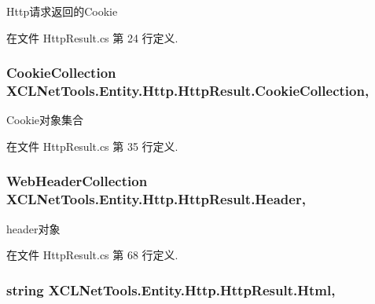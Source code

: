 Http请求返回的\-Cookie 



在文件 Http\-Result.\-cs 第 24 行定义.

\hypertarget{class_x_c_l_net_tools_1_1_entity_1_1_http_1_1_http_result_a30f5eb22081db0c17f2924ac0ee89156}{
\subsubsection[{Cookie\-Collection}]{\setlength{\rightskip}{0pt plus 5cm}Cookie\-Collection X\-C\-L\-Net\-Tools.\-Entity.\-Http.\-Http\-Result.\-Cookie\-Collection\hspace{0.3cm}{\ttfamily [get]}, {\ttfamily [set]}}}\label{class_x_c_l_net_tools_1_1_entity_1_1_http_1_1_http_result_a30f5eb22081db0c17f2924ac0ee89156}


Cookie对象集合 



在文件 Http\-Result.\-cs 第 35 行定义.

\hypertarget{class_x_c_l_net_tools_1_1_entity_1_1_http_1_1_http_result_af2f67a87b13cf52358900ff814f88f20}{
\subsubsection[{Header}]{\setlength{\rightskip}{0pt plus 5cm}Web\-Header\-Collection X\-C\-L\-Net\-Tools.\-Entity.\-Http.\-Http\-Result.\-Header\hspace{0.3cm}{\ttfamily [get]}, {\ttfamily [set]}}}\label{class_x_c_l_net_tools_1_1_entity_1_1_http_1_1_http_result_af2f67a87b13cf52358900ff814f88f20}


header对象 



在文件 Http\-Result.\-cs 第 68 行定义.

\hypertarget{class_x_c_l_net_tools_1_1_entity_1_1_http_1_1_http_result_a9fc43bbbeb2f24faeeab16785cd7c402}{
\subsubsection[{Html}]{\setlength{\rightskip}{0pt plus 5cm}string X\-C\-L\-Net\-Tools.\-Entity.\-Http.\-Http\-Result.\-Html\hspace{0.3cm}{\ttfamily [get]}, {\ttfamily [set]}}}\label{class_x_c_l_net_tools_1_1_entity_1_1_http_1_1_http_result_a9fc43bbbeb2f24faeeab16785cd7c402}



